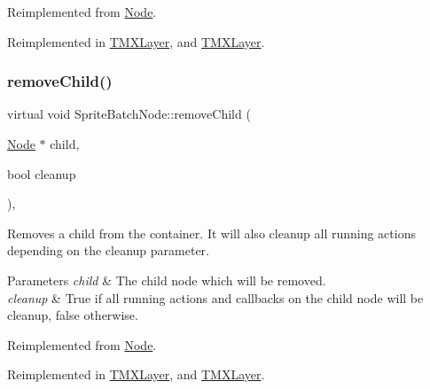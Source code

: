 Reimplemented from \hyperlink{classNode_a872d4a7d389b26b0c6ad7ed99c8b1b65}{Node}.



Reimplemented in \hyperlink{classTMXLayer_abaf25490e1f7807816c07167a8d4af46}{T\+M\+X\+Layer}, and \hyperlink{classTMXLayer_abaf25490e1f7807816c07167a8d4af46}{T\+M\+X\+Layer}.

\mbox{\label{classSpriteBatchNode_a918786ec36ffac4169444d478e455c5c}} 
\subsubsection{\texorpdfstring{remove\+Child()}{removeChild()}\hspace{0.1cm}{\footnotesize\ttfamily [2/2]}}
{\footnotesize\ttfamily virtual void Sprite\+Batch\+Node\+::remove\+Child (\begin{DoxyParamCaption}\item[{\hyperlink{classNode}{Node} $\ast$}]{child,  }\item[{bool}]{cleanup }\end{DoxyParamCaption})\hspace{0.3cm}{\ttfamily [override]}, {\ttfamily [virtual]}}

Removes a child from the container. It will also cleanup all running actions depending on the cleanup parameter.


\begin{DoxyParams}{Parameters}
{\em child} & The child node which will be removed. \\
\hline
{\em cleanup} & True if all running actions and callbacks on the child node will be cleanup, false otherwise. \\
\hline
\end{DoxyParams}


Reimplemented from \hyperlink{classNode_a872d4a7d389b26b0c6ad7ed99c8b1b65}{Node}.



Reimplemented in \hyperlink{classTMXLayer_abaf25490e1f7807816c07167a8d4af46}{T\+M\+X\+Layer}, and \hyperlink{classTMXLayer_abaf25490e1f7807816c07167a8d4af46}{T\+M\+X\+Layer}.

\mbox{\label{classSpriteBatchNode_a3da2c77141f4f02134d2a8f2308879ff}} 
